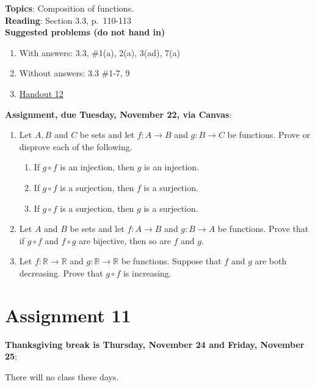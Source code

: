 \documentclass[12pt]{article}
\newcommand{\R}{{\mathbb R}}
\begin{document}
\textbf{Topics}: Composition of functions.
\\

\noindent \textbf{Reading}: Section 3.3, p.~110-113
\\


\noindent \textbf{Suggested problems (do not hand in)}

\begin{enumerate}
\item With answers: 3.3, \#1(a), 2(a), 3(ad), 7(a)
\item Without answers: 3.3 \#1-7, 9
\item \href{https://www.math.emory.edu/~dzb/teaching/250Fall2021/handouts/250-H12-compositions.pdf}{Handout 12}
\end{enumerate}


\noindent \textbf{Assignment, due Tuesday, November 22, via Canvas}:
\begin{enumerate}
\item Let $A, B$ and $C$ be sets and let $f \colon A \to B$ and $g \colon B \to C$ be functions. Prove or disprove each of the following.
 \begin{enumerate}
 \item If $g\circ f$ is an injection, then $g$ is an injection.
 \item If $g\circ f$ is a surjection, then $f$ is a surjection.
 \item If $g\circ f$ is a surjection, then $g$ is a surjection.
 \end{enumerate}
\item Let $A$ and $B$ be sets and let $f \colon A \to B$ and $g \colon B \to A$ be functions. Prove that if $g \circ f$ and $f \circ g$ are bijective, then so are $f$ and $g$.

 \item Let $f \colon \R \to \R$ and $g \colon \R \to \R$ be functions. Suppose that $f$ and $g$ are both decreasing. Prove that $g \circ f$ is increasing.
 \end{enumerate}



 
\newpage
\section[11 (due December 1): Inverse functions.]{Assignment 11}

\noindent \textbf{Thanksgiving break is Thursday, November 24 and Friday, November 25};

\noindent There will no class these days.
\\
\end{document}
